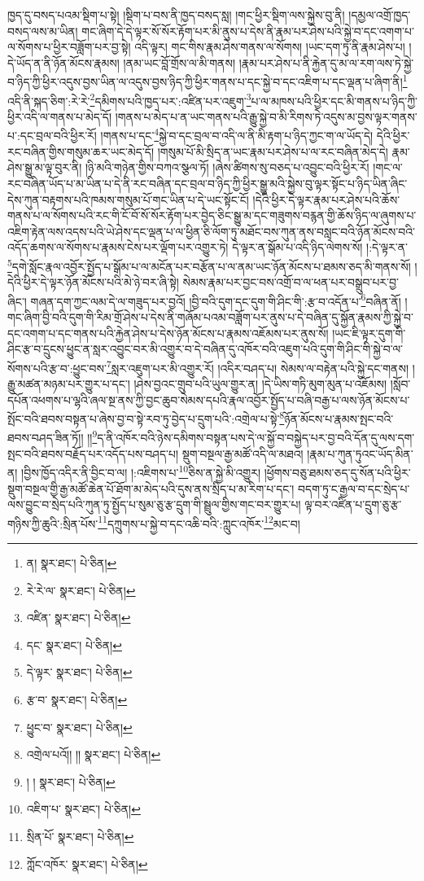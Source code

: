 ཁྱད་དུ་བསད་པའམ་སྡིག་པ་སྟེ། །སྡིག་པ་བས་ནི་ཁྱད་བསད་སླ། །གང་ཕྱིར་སྡིག་ལས་སྐྱེས་བུ་ནི། །དམྱལ་འགྲོ་ཁྱད་བསད་ལས་མ་ཡིན། གང་ཞིག་དེ་དེ་ལྟར་སོ་སོར་རྟོག་པར་མི་ནུས་པ་དེས་ནི་རྣམ་པར་ཤེས་པའི་སྐྱེ་བ་དང་འགག་པ་ལ་སོགས་པ་ཕྱིར་བཟློག་པར་བྱ་སྟེ། འདི་ལྟར། གང་གིས་རྣམ་ཤེས་གནས་ལ་སོགས། །ཡང་དག་ཏུ་ནི་རྣམ་ཤེས་པ། །དེ་ཡོད་ན་ནི་ཉོན་མོངས་རྣམས། །ནམ་ཡང་བློ་གྲོས་ལ་མི་གནས། །རྣམ་པར་ཤེས་པ་ནི་རྐྱེན་དུ་མ་ལ་རག་ལས་ཏེ་སྐྱེ་བ་ཉིད་ཀྱི་ཕྱིར་འདུས་བྱས་ཡིན་ལ་འདུས་བྱས་ཉིད་ཀྱི་ཕྱིར་གནས་པ་དང་སྐྱེ་བ་དང་འཇིག་པ་དང་ལྡན་པ་ཞིག་ནི།\footnote{ན།  སྣར་ཐང་།  པེ་ཅིན། } འདི་ནི་སྐད་ཅིག་:རེ་རེ་\footnote{རེ་རེ་ལ་  སྣར་ཐང་།  པེ་ཅིན། }དམིགས་པའི་ཁྱད་པར་:འཛིན་པར་འཇུག་\footnote{འཛིན་  སྣར་ཐང་།  པེ་ཅིན། }པ་ལ་མཁས་པའི་ཕྱིར་དང་མི་གནས་པ་ཉིད་ཀྱི་ཕྱིར་འདི་ལ་གནས་པ་མེད་དོ། །གནས་པ་མེད་པ་ན་ཡང་གནས་པའི་རྒྱུ་སྐྱེ་བ་མི་རིགས་ཏེ་འདུས་མ་བྱས་ལྟར་གནས་པ་:དང་བྲལ་བའི་ཕྱིར་རོ། །གནས་པ་དང་\footnote{དང་  སྣར་ཐང་།  པེ་ཅིན། }སྐྱེ་བ་དང་བྲལ་བ་འདི་ལ་ནི་མི་རྟག་པ་ཉིད་ཀྱང་ག་ལ་ཡོད་དེ། དེའི་ཕྱིར་རང་བཞིན་གྱིས་གསུམ་ཆར་ཡང་མེད་དོ། །གསུམ་པོ་མི་སྲིད་ན་ཡང་རྣམ་པར་ཤེས་པ་ལ་རང་བཞིན་མེད་དེ། རྣམ་ཤེས་སྒྱུ་མ་ལྟ་བུར་ནི། །ཉི་མའི་གཉེན་གྱིས་བཀའ་སྩལ་ཏོ། །ཞེས་ཚིགས་སུ་བཅད་པ་འབྱུང་བའི་ཕྱིར་རོ། །གང་ལ་རང་བཞིན་ཡོད་པ་མ་ཡིན་པ་དེ་ནི་རང་བཞིན་དང་བྲལ་བ་ཉིད་ཀྱི་ཕྱིར་སྒྱུ་མའི་སྐྱེས་བུ་ལྟར་སྟོང་པ་ཉིད་ཡིན་ཞིང་དེས་ཀུན་བརྟགས་པའི་ཁམས་གསུམ་པོ་གང་ཡིན་པ་དེ་ཡང་སྟོང་ངོ། །དེའི་ཕྱིར་དེ་ལྟར་རྣམ་པར་ཤེས་པའི་ཆོས་གནས་པ་ལ་སོགས་པའི་རང་གི་ངོ་བོ་སོ་སོར་རྟོག་པར་བྱེད་ཅིང་སྒྱུ་མ་དང་གཟུགས་བརྙན་གྱི་ཆོས་ཉིད་ལ་ཞུགས་པ་འཇིག་རྟེན་ལས་འདས་པའི་ཡེ་ཤེས་དང་ལྡན་པ་ལ་ཕྱིན་ཅི་ལོག་ཏུ་མཐོང་བས་ཀུན་ནས་བསླང་བའི་ཉོན་མོངས་བའི་འདོད་ཆགས་ལ་སོགས་པ་རྣམས་ངེས་པར་ལྡོག་པར་འགྱུར་ཏེ། དེ་ལྟར་ན་སྒོམ་པ་འདི་ཉིད་ལེགས་སོ། །:དེ་ལྟར་ན་\footnote{དེ་ལྟར་  སྣར་ཐང་།  པེ་ཅིན། }དགེ་སློང་རྣལ་འབྱོར་སྤྱོད་པ་སྒོམ་པ་ལ་མངོན་པར་བརྩོན་པ་ལ་ནམ་ཡང་ཉོན་མོངས་པ་ཐམས་ཅད་མི་གནས་སོ། །དེའི་ཕྱིར་དེ་ལྟར་ཉོན་མོངས་པའི་མེ་ཉེ་བར་ཞི་སྟེ། སེམས་རྣམ་པར་བྱང་བས་འགྲོ་བ་ལ་ཕན་པར་བསྒྲུབ་པར་བྱ་ཞིང་། གཞན་དག་ཀྱང་ལམ་དེ་ལ་གཟུད་པར་བྱའོ། །བྱི་བའི་དུག་དང་དུག་གི་ཤིང་གི་:རྩ་བ་འདོན་པ་\footnote{རྩ་བ་  སྣར་ཐང་།  པེ་ཅིན། }བཞིན་ནོ། །གང་ཞིག་བྱི་བའི་དུག་གི་རིམ་གྲོ་ཤེས་པ་དེས་ནི་གཞོམ་པའམ་བཟློག་པར་ནུས་པ་དེ་བཞིན་དུ་སྐྱོན་རྣམས་ཀྱི་སྐྱེ་བ་དང་འགག་པ་དང་གནས་པའི་རྐྱེན་ཤེས་པ་དེས་ཉོན་མོངས་པ་རྣམས་འཇོམས་པར་ནུས་སོ། །ཡང་ཇི་ལྟར་དུག་གི་ཤིང་རྩ་བ་དྲུངས་ཕྱུང་ན་སླར་འབྱུང་བར་མི་འགྱུར་བ་དེ་བཞིན་དུ་འཁོར་བའི་འཇུག་པའི་དུག་གི་ཤིང་གི་སྐྱེ་བ་ལ་སོགས་པའི་རྩ་བ་:ཕྱུང་བས་\footnote{ཕྱུང་བ་  སྣར་ཐང་།  པེ་ཅིན། }སླར་འཇུག་པར་མི་འགྱུར་རོ། །འདིར་བཤད་པ། སེམས་ལ་བརྟེན་པའི་སྐྱེ་དང་གནས། །རྒྱུ་མཚན་མཉམ་པར་གྱུར་པ་དང་། །ཤེས་བྱའང་གྲུབ་པའི་ཡུལ་གྱུར་ན། །དེ་ཡིས་གཏི་མུག་མུན་པ་འཇོམས། །སློབ་དཔོན་འཕགས་པ་ལྷའི་ཞལ་སྔ་ནས་ཀྱི་བྱང་ཆུབ་སེམས་དཔའི་རྣལ་འབྱོར་སྤྱོད་པ་བཞི་བརྒྱ་པ་ལས་ཉོན་མོངས་པ་སྤོང་བའི་ཐབས་བསྟན་པ་ཞེས་བྱ་བ་སྟེ་རབ་ཏུ་བྱེད་པ་དྲུག་པའི་:འགྲེལ་པ་སྟེ་\footnote{འགྲེལ་པའོ།། །།  སྣར་ཐང་།  པེ་ཅིན། }ཉོན་མོངས་པ་རྣམས་སྤང་བའི་ཐབས་བཤད་ཟིན་ཏོ།། །།\footnote{། །  སྣར་ཐང་།  པེ་ཅིན། }ད་ནི་འཁོར་བའི་ཉེས་དམིགས་བསྟན་པས་དེ་ལ་སྐྱོ་བ་བསྐྱེད་པར་བྱ་བའི་དོན་དུ་ལས་དག་སྤང་བའི་ཐབས་བརྗོད་པར་འདོད་པས་བཤད་པ། སྡུག་བསྔལ་རྒྱ་མཚོ་འདི་ལ་མཐའ། །རྣམ་པ་ཀུན་ཏུའང་ཡོད་མིན་ན། །བྱིས་ཁྱོད་འདིར་ནི་བྱིང་བ་ལ། །:འཇིགས་པ་\footnote{འཇིག་པ་  སྣར་ཐང་།  པེ་ཅིན། }ཅིས་ན་སྐྱེ་མི་འགྱུར། །ཕྱོགས་བཅུ་ཐམས་ཅད་དུ་སོན་པའི་ཕྱིར་སྡུག་བསྔལ་གྱི་རྒྱ་མཚོ་ཆེན་པོ་ཐོག་མ་མེད་པའི་དུས་ནས་སྲིད་པ་མ་རིག་པ་དང་། བདག་ཏུ་ང་རྒྱལ་བ་དང་སྲེད་པ་ལས་བྱུང་བ་སྲེད་པའི་ཀུན་ཏུ་སྤྱོད་པ་སུམ་ཅུ་རྩ་དྲུག་གི་སྦྲུལ་གྱིས་གང་བར་གྱུར་པ། ལྟ་བར་འཛིན་པ་དྲུག་ཅུ་རྩ་གཉིས་ཀྱི་ཆུའི་:སྲིན་པོས་\footnote{སྲིན་པོ་  སྣར་ཐང་།  པེ་ཅིན། }དཀྲུགས་པ་སྐྱེ་བ་དང་འཆི་བའི་:ཀླུང་འཁོར་\footnote{ཀློང་འཁོར་  སྣར་ཐང་།  པེ་ཅིན། }མང་བ། 